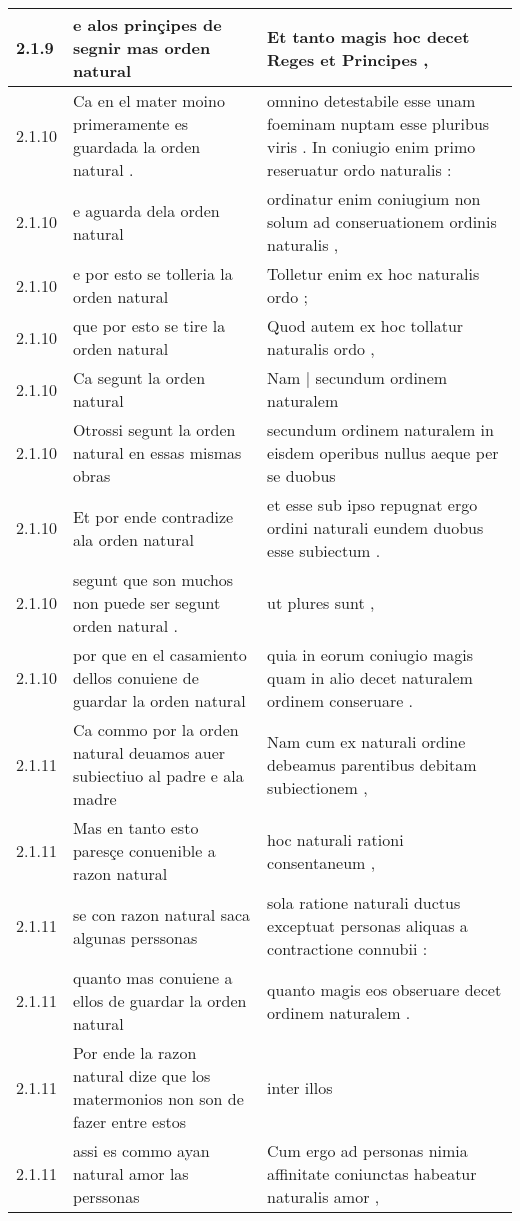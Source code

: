 \begin{tabular}{|p{1cm}|p{6.5cm}|p{6.5cm}|}
2.1.9 & e alos prinçipes de segnir mas orden natural & Et tanto magis hoc decet Reges et Principes , \\\hline
2.1.10 & Ca en el mater moino primeramente es guardada la orden natural . & omnino detestabile esse unam foeminam nuptam esse pluribus viris . In coniugio enim primo reseruatur ordo naturalis : \\\hline
2.1.10 & e aguarda dela orden natural & ordinatur enim coniugium non solum ad conseruationem ordinis naturalis , \\\hline
2.1.10 & e por esto se tolleria la orden natural & Tolletur enim ex hoc naturalis ordo ; \\\hline
2.1.10 & que por esto se tire la orden natural & Quod autem ex hoc tollatur naturalis ordo , \\\hline
2.1.10 & Ca segunt la orden natural & Nam | secundum ordinem naturalem \\\hline
2.1.10 & Otrossi segunt la orden natural en essas mismas obras & secundum ordinem naturalem in eisdem operibus nullus aeque per se duobus \\\hline
2.1.10 & Et por ende contradize ala orden natural & et esse sub ipso repugnat ergo ordini naturali eundem duobus esse subiectum . \\\hline
2.1.10 & segunt que son muchos non puede ser segunt orden natural . & ut plures sunt , \\\hline
2.1.10 & por que en el casamiento dellos conuiene de guardar la orden natural & quia in eorum coniugio magis quam in alio decet naturalem ordinem conseruare . \\\hline
2.1.11 & Ca commo por la orden natural deuamos auer subiectiuo al padre e ala madre & Nam cum ex naturali ordine debeamus parentibus debitam subiectionem , \\\hline
2.1.11 & Mas en tanto esto paresçe conuenible a razon natural & hoc naturali rationi consentaneum , \\\hline
2.1.11 & se con razon natural saca algunas perssonas & sola ratione naturali ductus exceptuat personas aliquas a contractione connubii : \\\hline
2.1.11 & quanto mas conuiene a ellos de guardar la orden natural & quanto magis eos obseruare decet ordinem naturalem . \\\hline
2.1.11 & Por ende la razon natural dize que los matermonios non son de fazer entre estos & inter illos \\\hline
2.1.11 & assi es commo ayan natural amor las perssonas & Cum ergo ad personas nimia affinitate coniunctas habeatur naturalis amor , \\\hline

\end{tabular}

